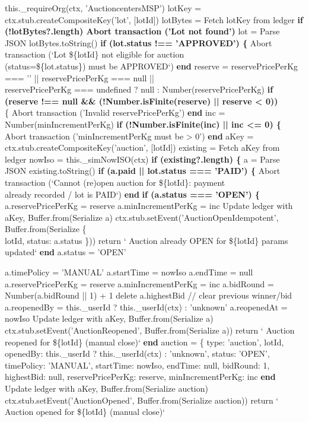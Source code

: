 \documentclass[12pt]{article}
\begin{document}
\begin{algorithm}[H]
\caption{openAuction() (Part 1 of 2)}
this.\_requireOrg(ctx, 'AuctioncentersMSP')\;
lotKey = ctx.stub.createCompositeKey('lot', [lotId])\;
lotBytes = Fetch lotKey from ledger\;
\textbf{if (!lotBytes?.length) Abort transaction ('Lot not found')}\;
lot = Parse JSON lotBytes.toString()\;
\textbf{if (lot.status !== 'APPROVED') \{}\;
Abort transaction (`Lot \$\{lotId\} not eligible for auction\\
\quad (status=\$\{lot.status\}) must be APPROVED`)\;
\textbf{end}\;
reserve =\;
reservePricePerKg === '' || reservePricePerKg === null ||\\
\quad reservePricePerKg === undefined\;
? null\;
: Number(reservePricePerKg)\;
\textbf{if (reserve !== null \&\& (!Number.isFinite(reserve) || reserve < 0))}\\
\quad \{\;
Abort transaction ('Invalid reservePricePerKg')\;
\textbf{end}\;
inc = Number(minIncrementPerKg)\;
\textbf{if (!Number.isFinite(inc) || inc <= 0) \{}\;
Abort transaction ('minIncrementPerKg must be > 0')\;
\textbf{end}\;
aKey = ctx.stub.createCompositeKey('auction', [lotId])\;
existing = Fetch aKey from ledger\;
nowIso = this.\_simNowISO(ctx)\;
\textbf{if (existing?.length) \{}\;
a = Parse JSON existing.toString()\;
\textbf{if (a.paid || lot.status === 'PAID') \{}\;
Abort transaction (`Cannot (re)open auction for \$\{lotId\}: payment\\
\quad already recorded / lot is PAID`)\;
\textbf{end}\;
\textbf{if (a.status === 'OPEN') \{}\;
a.reservePricePerKg = reserve\;
a.minIncrementPerKg = inc\;
Update ledger with aKey, Buffer.from(Serialize a)\;
ctx.stub.setEvent('AuctionOpenIdempotent', Buffer.from(Serialize \{\\
\quad lotId, status: a.status \}))\;
return ` Auction already OPEN for \$\{lotId\} params updated`\;
\textbf{end}\;
a.status = 'OPEN'\;
\end{algorithm}


\begin{algorithm}[H]
\caption{openAuction() (Part 2 of 2)}
a.timePolicy = 'MANUAL'\;
a.startTime = nowIso\;
a.endTime = null\;
a.reservePricePerKg = reserve\;
a.minIncrementPerKg = inc\;
a.bidRound = Number(a.bidRound || 1) + 1\;
delete a.highestBid // clear previous winner/bid\;
a.reopenedBy = this.\_userId ? this.\_userId(ctx) : 'unknown'\;
a.reopenedAt = nowIso\;
Update ledger with aKey, Buffer.from(Serialize a)\;
ctx.stub.setEvent('AuctionReopened', Buffer.from(Serialize a))\;
return ` Auction reopened for \$\{lotId\} (manual close)`\;
\textbf{end}\;
auction = \{\;
type: 'auction',\;
lotId,\;
openedBy: this.\_userId ? this.\_userId(ctx) : 'unknown',\;
status: 'OPEN',\;
timePolicy: 'MANUAL',\;
startTime: nowIso,\;
endTime: null,\;
bidRound: 1,\;
highestBid: null,\;
reservePricePerKg: reserve,\;
minIncrementPerKg: inc\;
\textbf{end}\;
Update ledger with aKey, Buffer.from(Serialize auction)\;
ctx.stub.setEvent('AuctionOpened', Buffer.from(Serialize auction))\;
return ` Auction opened for \$\{lotId\} (manual close)`\;
\end{algorithm}
\end{document}
